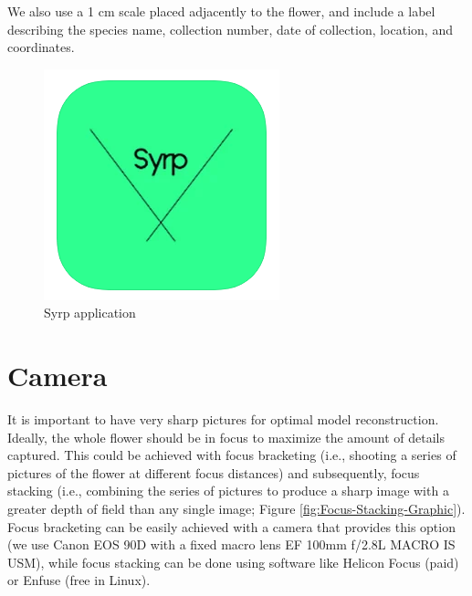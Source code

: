 \documentclass[
]{book}
\begin{document}
We also use a 1 cm scale placed adjacently to the flower, and include a label describing the species name, collection number, date of collection, location, and coordinates.

\begin{figure}

{\centering \includegraphics[width=0.2\linewidth]{Figures/Syrp_app} 

}

\caption{Syrp application}\label{fig:Syrp}
\end{figure}

\hypertarget{camera}{%
\section{Camera}\label{camera}}

It is important to have very sharp pictures for optimal model
reconstruction. Ideally, the whole flower should be in focus to maximize the amount
of details captured. This could be achieved with focus bracketing (i.e., shooting a series of pictures of the flower at different focus distances) and subsequently, focus stacking (i.e., combining the series of pictures to produce a sharp image with a greater depth of field than any single image; Figure \ref{fig:Focus-Stacking-Graphic}). Focus bracketing can be easily achieved with a camera that provides this option (we use Canon EOS 90D with a fixed macro lens EF 100mm f/2.8L MACRO IS USM), while focus stacking can be done using software like Helicon Focus (paid) or Enfuse (free in Linux).
\end{document}
